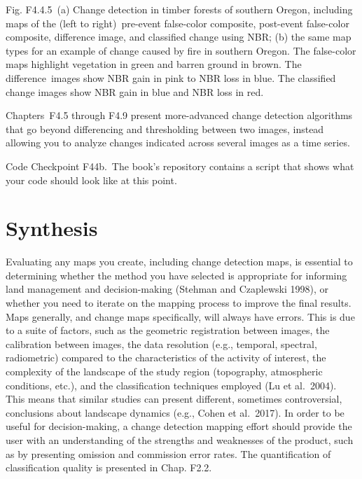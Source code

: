 \documentclass[
  letterpaper,
  DIV=11,
  numbers=noendperiod]{scrreprt}
\begin{document}
Fig. F4.4.5~(a) Change detection in timber forests of southern Oregon,
including maps of the (left to right)~pre-event false-color composite,
post-event false-color composite, difference image, and classified
change using NBR; (b) the same map types for an example of change caused
by fire in southern Oregon. The false-color maps highlight vegetation in
green and barren ground in brown. The difference~images show NBR gain in
pink to NBR loss in blue. The classified change images show NBR gain in
blue and NBR loss in red.

Chapters~F4.5 through F4.9 present more-advanced change detection
algorithms that go beyond differencing and thresholding between two
images, instead allowing you to analyze changes indicated across several
images as a time series.

\begin{tcolorbox}[enhanced jigsaw, left=2mm, breakable, rightrule=.15mm, opacityback=0, colframe=quarto-callout-note-color-frame, colbacktitle=quarto-callout-note-color!10!white, arc=.35mm, opacitybacktitle=0.6, toptitle=1mm, colback=white, leftrule=.75mm, title=\textcolor{quarto-callout-note-color}{\faInfo}\hspace{0.5em}{Note}, toprule=.15mm, bottomtitle=1mm, titlerule=0mm, bottomrule=.15mm, coltitle=black]

Code Checkpoint F44b.~The book's repository contains a script that shows
what your code should look like at this point.

\end{tcolorbox}

\hypertarget{synthesis-7}{%
\section*{Synthesis}\label{synthesis-7}}


Evaluating any maps you create, including change detection maps, is
essential to determining whether the method you have selected is
appropriate for informing land management and decision-making (Stehman
and Czaplewski 1998), or whether you need to iterate on the mapping
process to improve the final results. Maps generally, and change maps
specifically, will always have errors. This is due to a suite of
factors, such as the geometric registration between images, the
calibration between images, the data resolution (e.g., temporal,
spectral, radiometric) compared to the characteristics of the activity
of interest, the complexity of the landscape of the study region
(topography, atmospheric conditions, etc.), and the classification
techniques employed (Lu et al.~2004). This means that similar studies
can present different, sometimes controversial, conclusions about
landscape dynamics (e.g., Cohen et al.~2017). In order to be useful for
decision-making, a change detection mapping effort should provide the
user with an understanding of the strengths and weaknesses of the
product, such as by presenting omission and commission error rates. The
quantification of classification quality is presented in Chap. F2.2.
\end{document}
